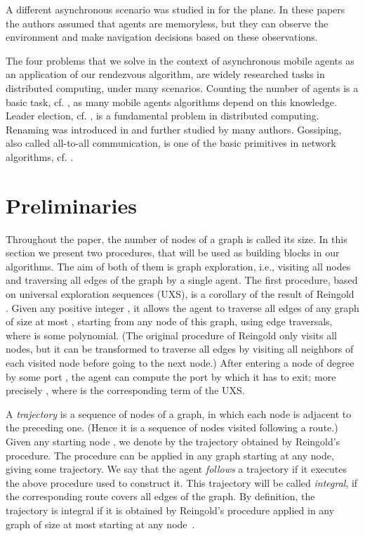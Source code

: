 \documentclass [11pt] {article}
\begin{document}
 A different asynchronous scenario was studied in \cite{CFPS,fpsw} for the plane. In these papers the authors assumed that agents are memoryless, but they can observe the environment and make navigation decisions based on these observations.
 
 The four problems that we solve in the context of asynchronous mobile agents as an application of our rendezvous algorithm, are
 widely researched tasks in distributed computing, under many scenarios. Counting the number of agents is a basic task, cf. \cite{FP3},
 as many mobile agents algorithms depend on this knowledge.  Leader election, cf. \cite{Ly},  is a fundamental problem in distributed
 computing. Renaming  was introduced in \cite{ABDKPR} and further studied by many authors. Gossiping, also called all-to-all communication,
 is one of the basic primitives in network algorithms, cf. \cite{FL}. 





\section{Preliminaries}\label{prelim}

Throughout the paper, 
the number of nodes of a graph is called its size.
In this section we {present two procedures}, that will be used as building blocks in our algorithms. 
The aim of both of them is graph exploration, i.e., visiting all nodes and traversing all edges of the graph by a single agent. 
The first procedure, based on universal exploration sequences (UXS), is a corollary of the  result of Reingold \cite{Re}. Given any positive integer , it allows the agent to traverse all edges of any graph of size at most ,
starting from any node of this graph, using  edge traversals, where  is some polynomial. (The original procedure of Reingold only visits all nodes, but it can be transformed to traverse all edges by visiting all neighbors of each visited node before going to the next node.) After entering a node of degree  by some port ,
the agent can compute the port  by which it has to exit; more precisely , where  is the corresponding term of the UXS.

A {\em trajectory} is a sequence of nodes of a graph, in which each node is adjacent to the preceding one. (Hence it is a sequence of nodes visited following a route.)
Given any starting node ,  we denote by  the trajectory obtained by Reingold's procedure. The procedure can be applied in any graph starting at any node, giving
some trajectory. We say that  the agent {\em follows} a trajectory if it executes the above procedure used to construct it.
This trajectory will be called {\em integral}, if the corresponding route covers all edges of the graph. By definition, the trajectory  is integral if it is
obtained by Reingold's procedure applied in any graph of size at most  starting at any node~. 
\end{document}
